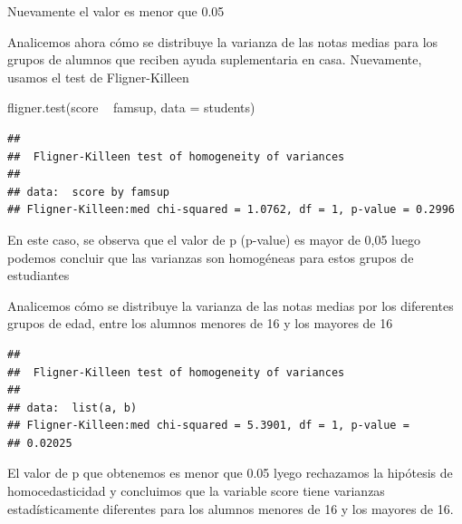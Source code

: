 \documentclass[]{article}
\newenvironment{Shaded}{\begin{snugshade}}{\end{snugshade}}
\newcommand{\DataTypeTok}[1]{\textcolor[rgb]{0.87,0.87,0.75}{#1}}
\newcommand{\DecValTok}[1]{\textcolor[rgb]{0.86,0.86,0.80}{#1}}
\newcommand{\KeywordTok}[1]{\textcolor[rgb]{0.94,0.87,0.69}{#1}}
\newcommand{\NormalTok}[1]{\textcolor[rgb]{0.80,0.80,0.80}{#1}}
\newcommand{\OperatorTok}[1]{\textcolor[rgb]{0.94,0.94,0.82}{#1}}
\newcommand{\StringTok}[1]{\textcolor[rgb]{0.80,0.58,0.58}{#1}}
\begin{document}
Nuevamente el valor es menor que 0.05

Analicemos ahora cómo se distribuye la varianza de las notas medias para
los grupos de alumnos que reciben ayuda suplementaria en casa.
Nuevamente, usamos el test de Fligner-Killeen

\begin{Shaded}
\begin{Highlighting}[]
\KeywordTok{fligner.test}\NormalTok{(score }\OperatorTok{~}\StringTok{ }\NormalTok{famsup, }\DataTypeTok{data =}\NormalTok{ students)}
\end{Highlighting}
\end{Shaded}

\begin{verbatim}
## 
##  Fligner-Killeen test of homogeneity of variances
## 
## data:  score by famsup
## Fligner-Killeen:med chi-squared = 1.0762, df = 1, p-value = 0.2996
\end{verbatim}

En este caso, se observa que el valor de p (p-value) es mayor de 0,05
luego podemos concluir que las varianzas son homogéneas para estos
grupos de estudiantes

Analicemos cómo se distribuye la varianza de las notas medias por los
diferentes grupos de edad, entre los alumnos menores de 16 y los mayores
de 16

\begin{Shaded}
\end{Shaded}

\begin{verbatim}
## 
##  Fligner-Killeen test of homogeneity of variances
## 
## data:  list(a, b)
## Fligner-Killeen:med chi-squared = 5.3901, df = 1, p-value =
## 0.02025
\end{verbatim}

El valor de p que obtenemos es menor que 0.05 lyego rechazamos la
hipótesis de homocedasticidad y concluimos que la variable score tiene
varianzas estadísticamente diferentes para los alumnos menores de 16 y
los mayores de 16.
\end{document}
